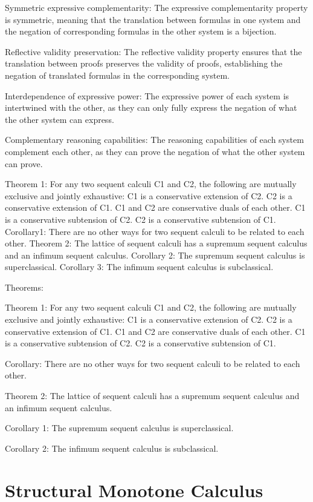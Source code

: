 Symmetric expressive complementarity: The expressive complementarity property is symmetric, meaning that the translation between formulas in one system and the negation of corresponding formulas in the other system is a bijection.

Reflective validity preservation: The reflective validity property ensures that the translation between proofs preserves the validity of proofs, establishing the negation of translated formulas in the corresponding system.

Interdependence of expressive power: The expressive power of each system is intertwined with the other, as they can only fully express the negation of what the other system can express.

Complementary reasoning capabilities: The reasoning capabilities of each system complement each other, as they can prove the negation of what the other system can prove.


Theorem 1: For any two sequent calculi C1 and C2, the following are mutually exclusive and jointly exhaustive:
C1 is a conservative extension of C2.
C2 is a conservative extension of C1.
C1 and C2 are conservative duals of each other.
C1 is a conservative subtension of C2.
C2 is a conservative subtension of C1.
Corollary1: There are no other ways for two sequent calculi to be related to each other.
Theorem 2: The lattice of sequent calculi has a supremum sequent calculus and an infimum sequent calculus.
Corollary 2: The supremum sequent calculus is superclassical.
Corollary 3: The infimum sequent calculus is subclassical.

Theorems:

Theorem 1: For any two sequent calculi C1 and C2, the following are mutually exclusive and jointly exhaustive:
C1 is a conservative extension of C2.
C2 is a conservative extension of C1.
C1 and C2 are conservative duals of each other.
C1 is a conservative subtension of C2.
C2 is a conservative subtension of C1.

Corollary: There are no other ways for two sequent calculi to be related to each other.

Theorem 2: The lattice of sequent calculi has a supremum sequent calculus and an infimum sequent calculus.

Corollary 1: The supremum sequent calculus is superclassical.

Corollary 2: The infimum sequent calculus is subclassical.

\section{Structural Monotone Calculus}
